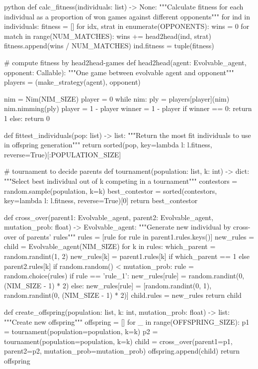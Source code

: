 \begin{mintedbox}{python}
    def calc_fitness(individuals: list) -> None:
        """Calculate fitness for each individual as a proportion of won games against different opponents"""
        for ind in individuals:
            fitness = []
            for idx, strat in enumerate(OPPONENTS):
                wins = 0
                for match in range(NUM_MATCHES):
                    wins += head2head(ind, strat)
                fitness.append(wins / NUM_MATCHES)
            ind.fitness = tuple(fitness)


    # compute fitness by head2head-games
    def head2head(agent: Evolvable_agent, opponent: Callable):
        """One game between evolvable agent and opponent"""
        players = (make_strategy(agent), opponent)

        nim = Nim(NIM_SIZE)
        player = 0
        while nim:
            ply = players[player](nim)
            nim.nimming(ply)
            player = 1 - player
        winner = 1 - player
        if winner == 0:
            return 1
        else:
            return 0

    def fittest_individuals(pop: list) -> list:
        """Return the most fit individuals to use in offspring generation"""
        return sorted(pop, key=lambda l: l.fitness, reverse=True)[:POPULATION_SIZE]


    # tournament to decide parents
    def tournament(population: list, k: int) -> dict:
        """Select best individual out of k competing in a tournament"""
        contestors = random.sample(population, k=k)
        best_contestor = sorted(contestors, key=lambda l: l.fitness, reverse=True)[0]
        return best_contestor


    def cross_over(parent1: Evolvable_agent, parent2: Evolvable_agent, mutation_prob: float) -> Evolvable_agent:
        """Generate new individual by cross-over of parents' rules"""
        rules = [rule for rule in parent1.rules.keys()]
        new_rules = {}
        child = Evolvable_agent(NIM_SIZE)
        for k in rules:
            which_parent = random.randint(1, 2)
            new_rules[k] = parent1.rules[k] if which_parent == 1 else parent2.rules[k]
        if random.random() < mutation_prob:
            rule = random.choice(rules)
            if rule == 'rule_1':
                new_rules[rule] = random.randint(0, (NIM_SIZE - 1) * 2)
            else:
                new_rules[rule] = [random.randint(0, 1), random.randint(0, (NIM_SIZE - 1) * 2)]
        child.rules = new_rules
        return child


    def create_offspring(population: list, k: int, mutation_prob: float) -> list:
        """Create new offspring"""
        offspring = []
        for _ in range(OFFSPRING_SIZE):
            p1 = tournament(population=population, k=k)
            p2 = tournament(population=population, k=k)
            child = cross_over(parent1=p1, parent2=p2, mutation_prob=mutation_prob)
            offspring.append(child)
        return offspring



\end{mintedbox}
